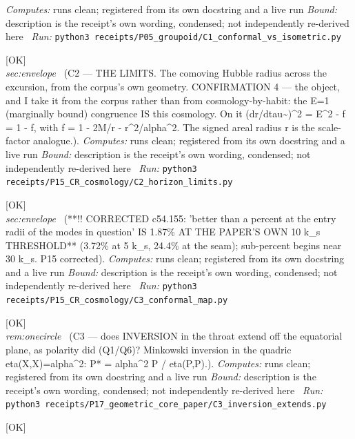 \begin{description}
\emph{Computes:} runs clean; registered from its own docstring and a live run
 \emph{Bound:} description is the receipt's own wording, condensed; not independently re-derived here
\ \emph{Run:} \texttt{python3 receipts/P05\_groupoid/C1\_conformal\_vs\_isometric.py}
\item[\label{rcpt:C2_horizon_limits}\texttt{C2\_horizon\_limits}]\hfill\textsf{[OK]}\\
\textit{sec:envelope} \ (C2 --- THE LIMITS. The comoving Hubble radius across the excursion, from the corpus's own geometry. CONFIRMATION 4 --- the object, and I take it from the corpus rather than from cosmology-by-habit: the E=1 (marginally bound) congruence IS this cosmology. On it (dr/dtau\textasciitilde{})\textasciicircum{}2 = E\textasciicircum{}2 - f = 1 - f, with f = 1 - 2M/r - r\textasciicircum{}2/alpha\textasciicircum{}2. The signed areal radius r is the scale-factor analogue.). 
\emph{Computes:} runs clean; registered from its own docstring and a live run
 \emph{Bound:} description is the receipt's own wording, condensed; not independently re-derived here
\ \emph{Run:} \texttt{python3 receipts/P15\_CR\_cosmology/C2\_horizon\_limits.py}
\item[\label{rcpt:C3_conformal_map}\texttt{C3\_conformal\_map}]\hfill\textsf{[OK]}\\
\textit{sec:envelope} \ (**!! CORRECTED c54.155: 'better than a percent at the entry radii of the modes in question' IS 1.87\% AT THE PAPER'S OWN 10 k\_s THRESHOLD** (3.72\% at 5 k\_s, 24.4\% at the seam); sub-percent begins near 30 k\_s. P15 corrected). 
\emph{Computes:} runs clean; registered from its own docstring and a live run
 \emph{Bound:} description is the receipt's own wording, condensed; not independently re-derived here
\ \emph{Run:} \texttt{python3 receipts/P15\_CR\_cosmology/C3\_conformal\_map.py}
\item[\label{rcpt:C3_inversion_extends}\texttt{C3\_inversion\_extends}]\hfill\textsf{[OK]}\\
\textit{rem:onecircle} \ (C3 --- does INVERSION in the throat extend off the equatorial plane, as polarity did (Q1/Q6)? Minkowski inversion in the quadric eta(X,X)=alpha\textasciicircum{}2: P* = alpha\textasciicircum{}2 P / eta(P,P).). 
\emph{Computes:} runs clean; registered from its own docstring and a live run
 \emph{Bound:} description is the receipt's own wording, condensed; not independently re-derived here
\ \emph{Run:} \texttt{python3 receipts/P17\_geometric\_core\_paper/C3\_inversion\_extends.py}
\item[\label{rcpt:C4_driving_envelope}\texttt{C4\_driving\_envelope}]\hfill\textsf{[OK]}\\

\end{description}
